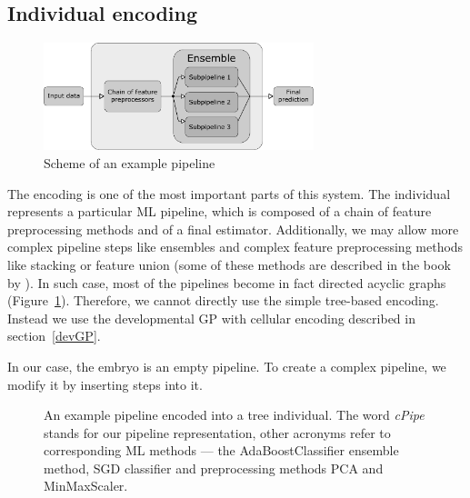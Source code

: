 \subsection{Individual encoding} \label{sec:encoding}
\begin{figure}[ht]\centering
\includegraphics[width=0.7\textwidth]{../img/pipeline-pdfa.pdf}
\caption{Scheme of an example pipeline}
\label{pic02:pipeline}
\end{figure}

The encoding is one of the most important parts of this system. The individual
represents a particular ML pipeline, which is composed of a chain of feature
preprocessing methods and of a final estimator. Additionally, we may allow
more complex pipeline steps like ensembles and complex feature
preprocessing methods like stacking or feature union (some of these methods are
described in the book by \cite{Brazdil:2008:MAD:1507541}). In such case, most of the
pipelines become in fact directed acyclic graphs (Figure~\ref{pic02:pipeline}).
Therefore, we cannot directly use the simple tree-based encoding. Instead we
use the developmental GP with cellular encoding described
in section~\ref{devGP}.

In our case, the embryo is an empty pipeline. To create a complex pipeline, we
modify it by inserting steps into it.

\begin{figure}[ht]\centering
    \qquad
    \caption[An example pipeline encoded into a tree individual]{
    An example pipeline encoded into a tree individual. The word \emph{cPipe}
    stands for our pipeline representation, other acronyms refer to
    corresponding ML methods --- the AdaBoostClassifier ensemble method,
    SGD classifier and preprocessing methods PCA and MinMaxScaler.
    }%
    \label{pic:pipeencoding}%
\end{figure}

